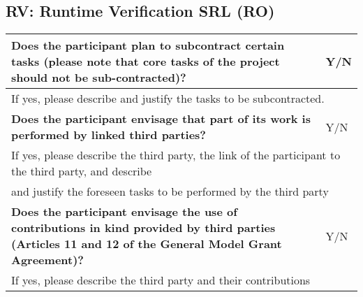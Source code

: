 \subsection{RV: Runtime Verification SRL (RO)}

\begin{longtable}{|p{}|p{}|}
\hline
{\bf Does the participant plan to subcontract certain tasks (please
  note that core tasks of the project should not be sub-contracted)?}
&
Y/N
\\
\hline
\multicolumn{2}{|l|}{
If yes, please describe and justify the tasks to be subcontracted.}
\\
\hline
{\bf Does the participant envisage that  part of its work is performed
  by linked third parties?}
&
Y/N
\\
\hline
\multicolumn{2}{|l|}{If yes, please describe the third party, the link of the
  participant to the third party, and describe}\\
\multicolumn{2}{|l|}{and justify the foreseen
tasks to be performed by the third party}
\\
\hline
{\bf Does the participant envisage the use of contributions in kind
provided by third parties (Articles 11 and 12 of the General Model
Grant Agreement)?}
&
Y/N
\\
\hline
\multicolumn{2}{|l|}{If yes, please describe the third party and their contributions}
\\
\hline
\end{longtable}










